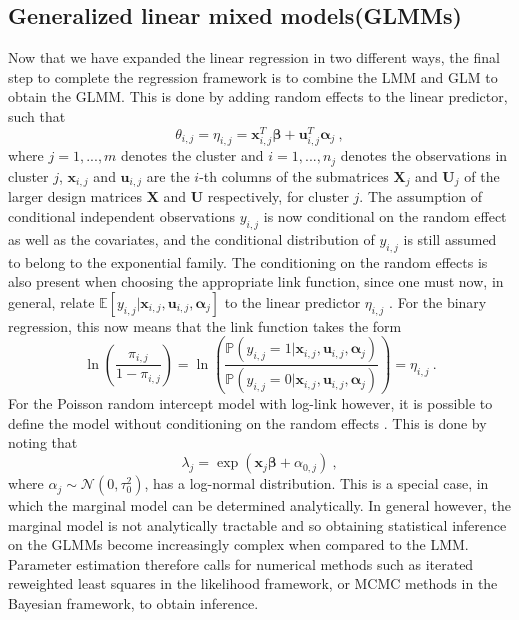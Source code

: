 \subsection{Generalized linear mixed models(GLMMs)}
\label{sec:GLMM}
Now that we have expanded the linear regression in two different ways, the final step to complete the regression framework is to combine the LMM and GLM to obtain the GLMM. This is done by adding random effects to the linear predictor, such that
\begin{equation}
    \theta_{i, j} = \eta_{i, j} = \mathbf{x}_{i, j}^T\boldsymbol{\beta} + \mathbf{u}_{i, j}^T \boldsymbol{\alpha}_j \ , %
\end{equation}
where $j =1, ..., m$ denotes the cluster and $i=1, ..., n_j$ denotes the observations in cluster $j$, $\mathbf{x}_{i, j}$ and $\mathbf{u}_{i, j}$ are the $i$-th columns of the submatrices $\mathbf{X}_{j}$ and $\mathbf{U}_{j}$ of the larger design matrices $\mathbf{X}$ and $\mathbf{U}$ respectively, for cluster $j$.
The assumption of conditional independent observations $y_{i, j}$ is now conditional on the random effect as well as the covariates, and the conditional distribution of $y_{i, j}$ is still assumed to belong to the exponential family. The conditioning on the random effects is also present when choosing the appropriate link function, since one must now, in general, relate $\mathbb{E}[y_{i, j} \lvert \mathbf{x}_{i, j}, \mathbf{u}_{i, j}, \boldsymbol{\alpha}_{j}]$ to the linear predictor $\eta_{i, j}$ \citep{GLMM_book}. For the binary regression, this now means that the link function takes the form 
\begin{equation}
    \ln \left(\frac{\pi_{i, j}}{1- \pi_{i, j}}\right) = \ln \left(\frac{\mathbb{P}(y_{i, j} = 1 \lvert \mathbf{x}_{i, j}, \mathbf{u}_{i, j}, \boldsymbol{\alpha}_{j})}{\mathbb{P}(y_{i, j} = 0 \lvert \mathbf{x}_{i, j}, \mathbf{u}_{i, j}, \boldsymbol{\alpha}_{j})}\right) = \eta_{i, j}  \ .
\end{equation}
For the Poisson random intercept model with log-link however, it is possible to define the model without conditioning on the random effects \citep{GLMM_book}. This is done by noting that
\begin{equation}
    \lambda_j = \exp(\mathbf{x}_j\boldsymbol{\beta} + \alpha_{0, j}) \ ,
\end{equation}
where $\alpha_j \sim \mathcal{N}(0, \tau_0^2)$, has a log-normal distribution. This is a special case, in which the marginal model can be determined analytically. In general however, the marginal model is not analytically tractable and so obtaining statistical inference on the GLMMs become increasingly complex when compared to the LMM. Parameter estimation therefore calls for numerical methods such as iterated reweighted least squares in the likelihood framework, or MCMC methods in the Bayesian framework, to obtain inference.

